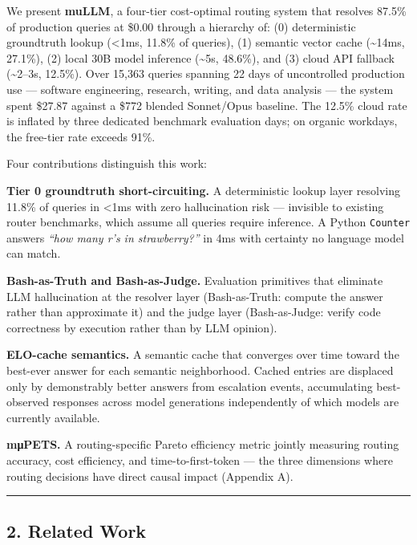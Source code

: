 We present \textbf{muLLM}, a four-tier cost-optimal routing system that resolves 87.5\% of production queries at \$0.00 through a hierarchy of: (0) deterministic groundtruth lookup (\textless1ms, 11.8\% of queries), (1) semantic vector cache (\textasciitilde14ms, 27.1\%), (2) local 30B model inference (\textasciitilde5s, 48.6\%), and (3) cloud API fallback (\textasciitilde2--3s, 12.5\%). Over 15,363 queries spanning 22 days of uncontrolled production use --- software engineering, research, writing, and data analysis --- the system spent \$27.87 against a \$772 blended Sonnet/Opus baseline. The 12.5\% cloud rate is inflated by three dedicated benchmark evaluation days; on organic workdays, the free-tier rate exceeds 91\%.

Four contributions distinguish this work:

\textbf{Tier 0 groundtruth short-circuiting.} A deterministic lookup layer resolving 11.8\% of queries in \textless1ms with zero hallucination risk --- invisible to existing router benchmarks, which assume all queries require inference. A Python \texttt{Counter} answers \emph{``how many r's in strawberry?''} in 4ms with certainty no language model can match.

\textbf{Bash-as-Truth and Bash-as-Judge.} Evaluation primitives that eliminate LLM hallucination at the resolver layer (Bash-as-Truth: compute the answer rather than approximate it) and the judge layer (Bash-as-Judge: verify code correctness by execution rather than by LLM opinion).

\textbf{ELO-cache semantics.} A semantic cache that converges over time toward the best-ever answer for each semantic neighborhood. Cached entries are displaced only by demonstrably better answers from escalation events, accumulating best-observed responses across model generations independently of which models are currently available.

\textbf{mμPETS.} A routing-specific Pareto efficiency metric jointly measuring routing accuracy, cost efficiency, and time-to-first-token --- the three dimensions where routing decisions have direct causal impact (Appendix A).

\begin{center}\rule{0.5\linewidth}{0.5pt}\end{center}

\subsection{2. Related Work}\label{related-work}

